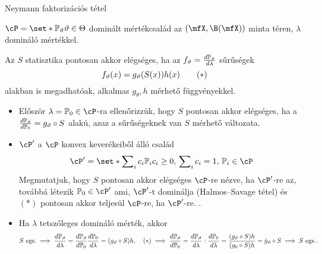 \documentclass[aspectratio=169,notheorems,9pt,\option]{beamer}
\begin{document}
\begin{frame}{Neymann faktorizációs tétel}
  \begin{theorem}
    $\cP=\set*{\P[\theta]}{\theta\in\Theta}$ dominált mértékcsalád az 
    $(\mfX,\B(\mfX))$ minta téren, $\lambda$ domináló mértékkel. 
    
    Az $S$  statisztika pontosan akkor elégséges, ha az 
    $f_\theta=\frac{d\P[\theta]}{d\lambda}$ 
    sűrűségek
    \begin{displaymath}
      f_{\theta}(x)=g_{\theta}(S(x))h(x)  \tag{\hbox{${*}$}}
    \end{displaymath}
    alakban is megadhatóak, 
    alkalmas $g_\theta,h$ mérhető függvényekkel.
  \end{theorem}
  \begin{itemize}
    \item Először $\lambda=\P[0]\in\cP$-ra ellenőrizzük, hogy $S$ pontosan 
    akkor elégséges, ha a $\frac{d\P[\theta]}{d\P[0]}=g_\theta\circ S$ alakú, azaz
    a sűrűségeknek van $S$ mérhető változata.
    \item $\cP'$ a $\cP$ konvex keverékeiből álló család  
    \begin{displaymath}
      \cP'=\set*{\sum\nolimits_i c_i\P[i]}{c_i\geq0,\,\sum\nolimits_i c_i=1,\,\P[i]\in\cP}  
    \end{displaymath}
    Megmutatjuk, hogy $S$ pontosan akkor elégséges $\cP$-re nézve, ha $\cP'$-re az, 
    továbbá létezik $\P[0]\in \cP'$ ami, $\cP'$-t dominálja (Halmos--Savage tétel) 
    és $(*)$ pontosan akkor teljesül $\cP$-re, ha $\cP'$-re. .
    \item Ha $\lambda$ tetszőleges domináló mérték, akkor 
    \begin{displaymath}
      \text{$S$ egs.}\implies\frac{d\P[\theta]}{d\lambda}
      =\frac{d\P[\theta]}{d\P[0]}\frac{d\P[0]}{d\lambda}
      =(g_\theta\circ S) h,
      \quad\text{$(*)$}\implies
      \frac{d\P[\theta]}{d\P[0]}=\frac{d\P[\theta]}{d\lambda}:\frac{d\P[0]}{d\lambda}
      =\frac{(g_\theta\circ S) h}{(g_0\circ S) h}
      =\tilde g_\theta\circ S\implies \text{$S$ egs.}.
    \end{displaymath}
  \end{itemize}

\end{frame}
\end{document}
